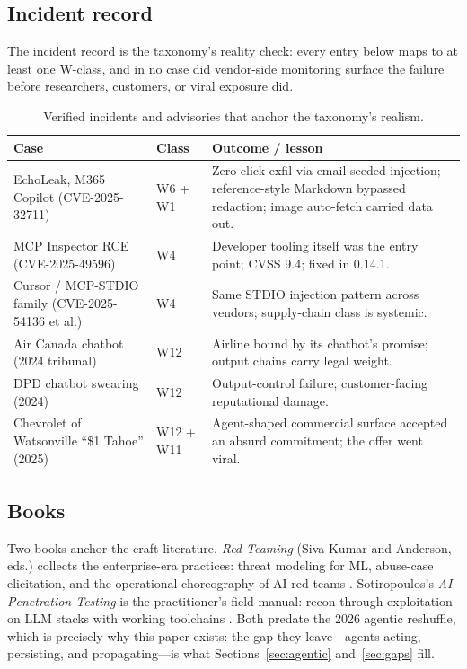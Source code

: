 \subsection{Incident record}\label{sec:incidents}

The incident record is the taxonomy's reality check: every entry below maps
to at least one W-class, and in no case did vendor-side monitoring surface
the failure before researchers, customers, or viral exposure did.

\begin{table}[htbp]
\centering
\small
\caption{Verified incidents and advisories that anchor the taxonomy's realism.}
\label{tab:incidents}
\begin{tabular}{L{3.2cm} L{5.0cm} L{5.2cm}}
\toprule
Case & Class & Outcome / lesson \\
\midrule
EchoLeak, M365 Copilot (CVE-2025-32711) \cite{echolake-cve,echolake-paper} &
W6 + W1 & Zero-click exfil via email-seeded injection; reference-style Markdown
bypassed redaction; image auto-fetch carried data out. \\
MCP Inspector RCE (CVE-2025-49596) \cite{cve-2025-49596,oligo-mcp} & W4 &
Developer tooling itself was the entry point; CVSS 9.4; fixed in 0.14.1. \\
Cursor / MCP-STDIO family (CVE-2025-54136 et al.) \cite{ox-mcp-family} & W4 &
Same STDIO injection pattern across vendors; supply-chain class is systemic. \\
Air Canada chatbot (2024 tribunal) & W12 & Airline bound by its chatbot's
promise; output chains carry legal weight. \\
DPD chatbot swearing (2024) & W12 & Output-control failure; customer-facing
reputational damage. \\
Chevrolet of Watsonville ``\$1 Tahoe'' (2025) & W12 + W11 & Agent-shaped
commercial surface accepted an absurd commitment; the offer went viral. \\
\bottomrule
\end{tabular}
\end{table}

\subsection{Books}\label{sec:books}

Two books anchor the craft literature. \emph{Red Teaming} (Siva Kumar and
Anderson, eds.) collects the enterprise-era practices: threat modeling for ML,
abuse-case elicitation, and the operational choreography of AI red teams
\cite{sivakumar-anderson}. Sotiropoulos's \emph{AI Penetration Testing} is the
practitioner's field manual: recon through exploitation on LLM stacks with
working toolchains \cite{sotiropoulos}. Both predate the 2026 agentic reshuffle,
which is precisely why this paper exists: the gap they leave---agents acting,
persisting, and propagating---is what Sections~\ref{sec:agentic}
and~\ref{sec:gaps} fill.
